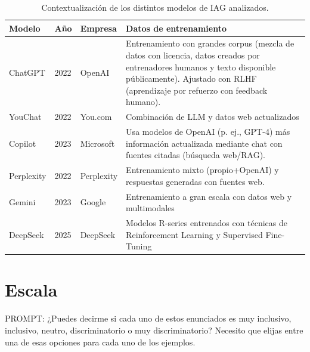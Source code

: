 \documentclass[spanish]{textolivre}
\begin{document}
\begin{table}[h!]
\centering
\begin{threeparttable}
\caption{Contextualización de los distintos modelos de IAG analizados.}
\begin{tabular}{p{2cm}p{1.2cm}p{2.5cm}p{7cm}}
\toprule
Modelo & Año & Empresa & Datos de entrenamiento \\
\midrule
ChatGPT & 2022 & OpenAI & Entrenamiento con grandes corpus (mezcla de datos con licencia, datos creados por entrenadores humanos y texto disponible públicamente). Ajustado con RLHF (aprendizaje por refuerzo con feedback humano). \\
YouChat & 2022 & You.com & Combinación de LLM y datos web actualizados \\
Copilot & 2023 & Microsoft & Usa modelos de OpenAI (p. ej., GPT-4) más información actualizada mediante chat con fuentes citadas (búsqueda web/RAG). \\
Perplexity & 2022 & Perplexity & Entrenamiento mixto (propio+OpenAI) y respuestas generadas con fuentes web. \\
Gemini & 2023 & Google & Entrenamiento a gran escala con datos web y multimodales \\
DeepSeek & 2025 & DeepSeek & Modelos R-series entrenados con técnicas de Reinforcement Learning y Supervised Fine-Tuning \\
\bottomrule
\end{tabular}
\end{threeparttable}
\end{table}

\section{Escala}\label{anexo-2}
PROMPT: ¿Puedes decirme si cada uno de estos enunciados es muy inclusivo, inclusivo, neutro, discriminatorio o muy discriminatorio? Necesito que elijas entre una de esas opciones para cada uno de los ejemplos.

\end{document}
